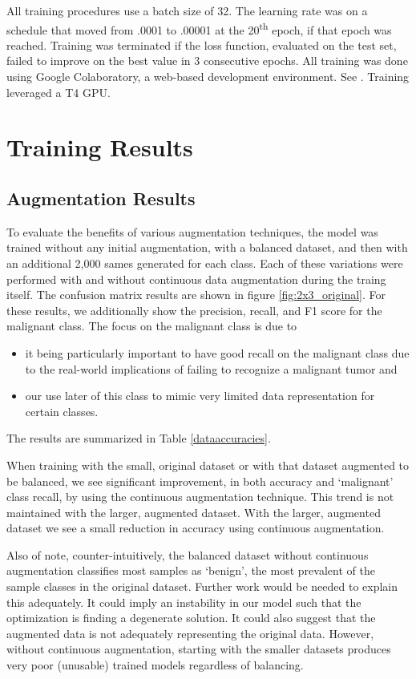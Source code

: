 \documentclass[sn-mathphys,Numbered]{sn-jnl}%
\theoremstyle{thmstyleone}%
\theoremstyle{thmstyletwo}%
\theoremstyle{thmstylethree}%
\begin{document}
All training procedures use a batch size of 32.  The learning rate was on a schedule that moved from .0001 to .00001 at the 20\textsuperscript{th} epoch, if that epoch was reached.  Training was terminated if the loss function, evaluated on the test set, failed to improve on the best value in 3 consecutive epochs.  All training was done using Google Colaboratory, a web-based development environment.  See \cite{colab}.  Training leveraged a T4 GPU.

\section{Training Results}\label{sectraining}
\subsection{Augmentation Results}\label{sectraining_augmentation}
To evaluate the benefits of various augmentation techniques, the model was trained without any initial augmentation, with a balanced dataset, and then with an additional 2,000 sames generated for each class.  Each of these variations were performed with and without continuous data augmentation during the traing itself.  The confusion matrix results are shown in figure \ref{fig:2x3_original}.   For these results, we additionally show the precision, recall, and F1 score for the malignant class.  The focus on the malignant class is due to
\begin{itemize}
\item it being particularly important to have good recall on the malignant class due to the real-world implications of failing to recognize a malignant tumor and
\item our use later of this class to mimic very limited data representation for certain classes.
\end{itemize}
The results are summarized in Table \ref{dataaccuracies}.

When training with the small, original dataset or with that dataset augmented to be balanced, we see significant improvement, in both accuracy and `malignant' class recall, by using the continuous augmentation technique.  This trend is not maintained with the larger, augmented dataset.  With the larger, augmented dataset we see a small reduction in accuracy using continuous augmentation.   

Also of note, counter-intuitively, the balanced dataset without continuous augmentation classifies most samples as `benign', the most prevalent of the sample classes in the original dataset.  Further work would be needed to explain this adequately.  It could imply an instability in our model such that the optimization is finding a degenerate solution.  It could also suggest that the augmented data is not adequately representing the original data.  However, without continuous augmentation, starting with the smaller datasets produces very poor (unusable) trained models regardless of balancing.
\end{document}
